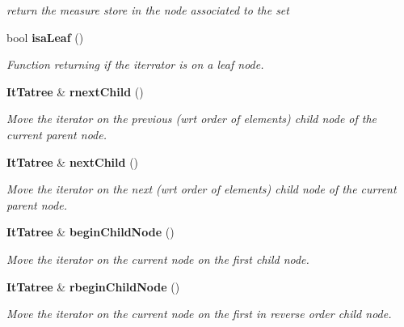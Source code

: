 \begin{CompactItemize}
\begin{CompactList}\small\item\em return the measure store in the node associated to the set \item\end{CompactList}\item 
bool {\bf isa\-Leaf} ()
\begin{CompactList}\small\item\em Function returning if the iterrator is on a leaf node. \item\end{CompactList}\item 
{\bf It\-Tatree} \& {\bf rnext\-Child} ()
\begin{CompactList}\small\item\em Move the iterator on the previous (wrt order of elements) child node of the current parent node. \item\end{CompactList}\item 
{\bf It\-Tatree} \& {\bf next\-Child} ()
\begin{CompactList}\small\item\em Move the iterator on the next (wrt order of elements) child node of the current parent node. \item\end{CompactList}\item 
{\bf It\-Tatree} \& {\bf begin\-Child\-Node} ()
\begin{CompactList}\small\item\em Move the iterator on the current node on the first child node. \item\end{CompactList}\item 
{\bf It\-Tatree} \& {\bf rbegin\-Child\-Node} ()
\begin{CompactList}\small\item\em Move the iterator on the current node on the first in reverse order child node. \item\end{CompactList}\end{CompactItemize}
